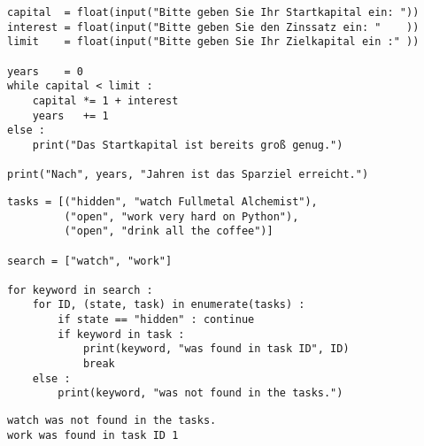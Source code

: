 
\begin{frame}[fragile]
%
\begin{codebox}
\begin{verbatim}
capital  = float(input("Bitte geben Sie Ihr Startkapital ein: "))
interest = float(input("Bitte geben Sie den Zinssatz ein: "    ))
limit    = float(input("Bitte geben Sie Ihr Zielkapital ein :" ))

years    = 0
while capital < limit :
    capital *= 1 + interest
    years   += 1
else :
    print("Das Startkapital ist bereits groß genug.")
  
print("Nach", years, "Jahren ist das Sparziel erreicht.")
\end{verbatim}
\end{codebox}
%
\end{frame}


\begin{frame}[fragile]
%
\begin{codebox}
\begin{verbatim}
tasks = [("hidden", "watch Fullmetal Alchemist"),
         ("open", "work very hard on Python"),
         ("open", "drink all the coffee")]
         
search = ["watch", "work"]

for keyword in search :
    for ID, (state, task) in enumerate(tasks) :
        if state == "hidden" : continue
        if keyword in task :
            print(keyword, "was found in task ID", ID)
            break
    else :
        print(keyword, "was not found in the tasks.")
\end{verbatim}
\end{codebox}
%
\begin{cmdbox}
\begin{verbatim}
watch was not found in the tasks.
work was found in task ID 1
\end{verbatim}
\end{cmdbox}
%
\end{frame}


